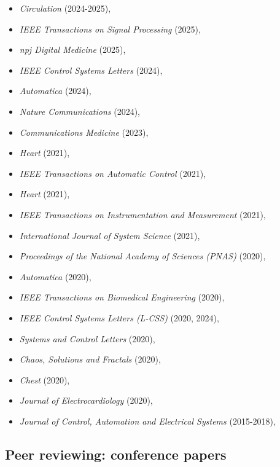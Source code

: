 \documentclass[10pt,A4]{article} %
\begin{document}
\begin{itemize}
 \item {\em Circulation } (2024-2025),  \item {\em IEEE Transactions on Signal Processing } (2025),  \item {\em npj Digital Medicine } (2025),  \item {\em IEEE Control Systems Letters } (2024),  \item {\em Automatica } (2024),  \item {\em Nature Communications } (2024),  \item {\em Communications Medicine } (2023),  \item {\em Heart } (2021),  \item {\em IEEE Transactions on Automatic Control } (2021),  \item {\em Heart } (2021),  \item {\em IEEE Transactions on Instrumentation and Measurement } (2021),  \item {\em International Journal of System Science } (2021),  \item {\em Proceedings of the National Academy of Sciences (PNAS) } (2020),  \item {\em Automatica } (2020),  \item {\em IEEE Transactions on Biomedical Engineering } (2020),  \item {\em IEEE Control Systems Letters (L-CSS) } (2020, 2024),  \item {\em Systems and Control Letters } (2020),  \item {\em Chaos, Solutions and Fractals } (2020),  \item {\em Chest } (2020),  \item {\em Journal of Electrocardiology } (2020),  \item {\em Journal of Control, Automation and Electrical Systems } (2015-2018), 
\end{itemize}

\subsection{Peer reviewing: conference papers}
\end{document}
